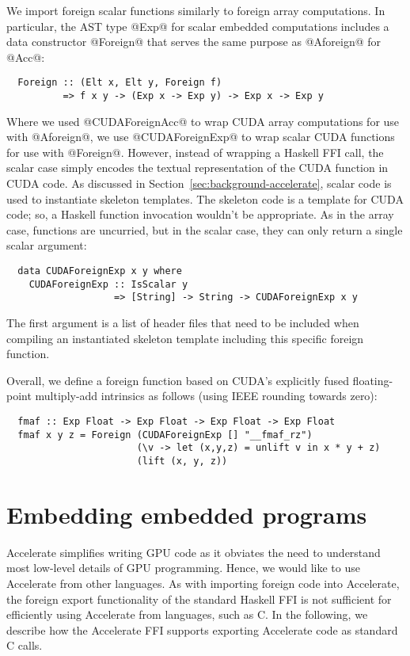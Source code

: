 We import foreign scalar functions similarly to foreign array computations. In particular, the AST type @Exp@ for scalar embedded computations includes a data constructor @Foreign@ that serves the same purpose as @Aforeign@ for @Acc@:
%
{\small
\begin{lstlisting}
  Foreign :: (Elt x, Elt y, Foreign f)
          => f x y -> (Exp x -> Exp y) -> Exp x -> Exp y
\end{lstlisting}
}\noindent%
%
Where we used @CUDAForeignAcc@ to wrap CUDA array computations for use with @Aforeign@, we use @CUDAForeignExp@ to wrap scalar CUDA functions for use with @Foreign@. However, instead of wrapping a Haskell FFI call, the scalar case simply encodes the textual representation of the CUDA function in CUDA code. As discussed in Section~\ref{sec:background-accelerate}, scalar code is used to instantiate skeleton templates. The skeleton code is a template for CUDA code; so, a Haskell function invocation wouldn't be appropriate. As in the array case, functions are uncurried, but in the scalar case, they can only return a single scalar argument:
%
{\small
\begin{lstlisting}
  data CUDAForeignExp x y where
    CUDAForeignExp :: IsScalar y
                   => [String] -> String -> CUDAForeignExp x y
\end{lstlisting}%
}\noindent
%
The first argument is a list of header files that need to be included when compiling an instantiated skeleton template including this specific foreign function.

Overall, we define a foreign function based on CUDA's explicitly fused floating-point multiply-add intrinsics as follows (using IEEE rounding towards zero):
%
{\small
\begin{lstlisting}
  fmaf :: Exp Float -> Exp Float -> Exp Float -> Exp Float
  fmaf x y z = Foreign (CUDAForeignExp [] "__fmaf_rz")
                       (\v -> let (x,y,z) = unlift v in x * y + z)
                       (lift (x, y, z))
\end{lstlisting}
}

\section{Embedding embedded programs}
\label{sec:foreign-export}

Accelerate simplifies writing GPU code as it obviates the need to understand most low-level details of GPU programming. Hence, we would like to use Accelerate from other languages. As with importing foreign code into Accelerate, the foreign export functionality of the standard Haskell FFI is not sufficient for efficiently using Accelerate from languages, such as C. In the following, we describe how the Accelerate FFI supports exporting Accelerate code as standard C calls.

